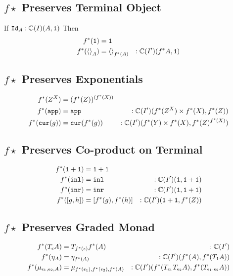 \subsection{$f\star$ Preserves Terminal Object}
If $\texttt{Id}_{A}:\mathbb{C}(I)(A, \texttt{1})$
Then 
\begin{align*}
    f^*(\texttt{1}) & = \texttt{1} \\
    f^*(\left\langle\right\rangle_{A}) & = \left\langle\right\rangle_{f^*(A)}&:\mathbb{C}(I')(f^* A, \texttt{1})\\
\end{align*}

\subsection{$f\star$ Preserves Exponentials}
\begin{align*}
    f^*(Z^X) & = (f^*(Z))^{(f^*(X))}\\
     f^*(\texttt{app}) &= \texttt{app}&:\mathbb{C}(I')(f^*(Z^X)\times f^*(X), f^*(Z))\\
     f^*(\texttt{cur}(g)) &= \texttt{cur}(f^*(g))&:\mathbb{C}(I')(f^*(Y)\times f^*(X), f^*(Z)^{f^*(X)})
\end{align*}

\subsection{$f\star$ Preserves Co-product on Terminal}

\begin{align*}
    f^*(\texttt{1}+\texttt{1}) &= \texttt{1}+\texttt{1}\\
    f^*(\texttt{inl})  &= \texttt{inl}&:\mathbb{C}(I')(\texttt{1}, \texttt{1}+\texttt{1}) \\
    f^*(\texttt{inr}) &= \texttt{inr}&:\mathbb{C}(I')(\texttt{1}, \texttt{1}+\texttt{1}) \\
    f^*([g, h]) &= [f^*(g), f^*(h)]&:\mathbb{C}(I')(\texttt{1}+\texttt{1}, f^*(Z))
\end{align*}

\subsection{$f\star$ Preserves Graded Monad}
\begin{align*}
    f^*(T_{\epsilon}{A}) &= T_{f^*(\epsilon)}{f^*(A)}&:\mathbb{C}(I')\\    
    f^*(\eta_{A}) &= \eta_{f^*(A)}&:\mathbb{C}(I')(f^*(A), f^*(T_{\texttt{1}}{A}))\\
    f^*(\mu_{\epsilon_1, \epsilon_2, A}) &= \mu_{f^*(\epsilon_1), f^*(\epsilon_2), f^*(A)}&:\mathbb{C}(I')(f^*(T_{\epsilon_1}{T_{\epsilon_2}{A}}), f^*(T_{\epsilon_1\cdot\epsilon_2}{A}))\\
\end{align*}

